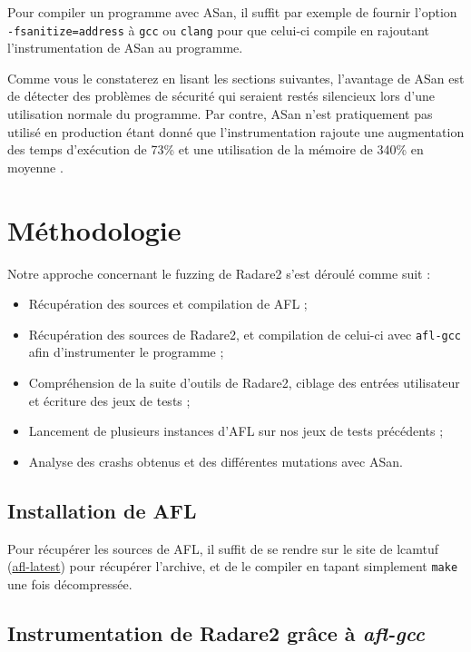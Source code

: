 Pour compiler un programme avec ASan, il suffit par exemple de fournir l'option \lstinline{-fsanitize=address} à \lstinline{gcc} ou \lstinline{clang} pour que celui-ci compile en rajoutant l'instrumentation de ASan au programme.

Comme vous le constaterez en lisant les sections suivantes, l'avantage de ASan est de détecter des problèmes de sécurité qui seraient restés silencieux lors d'une utilisation normale du programme.
Par contre, ASan n'est pratiquement pas utilisé en production étant donné que l'instrumentation rajoute une augmentation des temps d'exécution de 73\% et une utilisation de la mémoire de 340\% en moyenne \cite{asan}.

\section{Méthodologie}

Notre approche concernant le fuzzing de Radare2 s'est déroulé comme suit :

\begin{itemize}
\item Récupération des sources et compilation de AFL ;
\item Récupération des sources de Radare2, et compilation de celui-ci avec \lstinline{afl-gcc} afin d'instrumenter le programme ;
\item Compréhension de la suite d'outils de Radare2, ciblage des entrées utilisateur et écriture des jeux de tests ;
\item Lancement de plusieurs instances d'AFL sur nos jeux de tests précédents ;
\item Analyse des crashs obtenus et des différentes mutations avec ASan.
\end{itemize}

\subsection{Installation de AFL}

Pour récupérer les sources de AFL, il suffit de se rendre sur le site de lcamtuf (\href{http://lcamtuf.coredump.cx/afl/releases/afl-latest.tgz}{afl-latest}) pour récupérer l'archive, et de le compiler en tapant simplement \lstinline{make} une fois décompressée.

\subsection{Instrumentation de Radare2 grâce à \emph{afl-gcc}}

